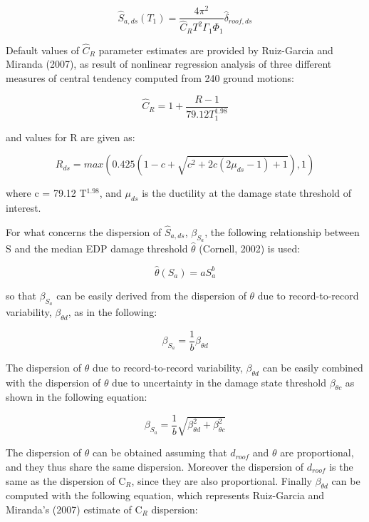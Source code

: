 \begin{equation}
\hat{S}_{a,ds}(T_1) = \frac{4 \pi^2}{\hat{C}_R T^2 \Gamma_1 \Phi_1} \hat{\delta}_{roof, ds}
\label{eq:Sa_RGM}
\end{equation}

Default values of $\hat{C}_R$ parameter estimates are provided by Ruiz-Garcia and Miranda (2007), as result of nonlinear regression analysis of three different measures of central tendency computed from 240 ground motions:

\begin{equation}
\hat{C}_R = 1 + \frac{R - 1}{79.12 T_1 ^{1.98}}
\label{eq:Cr_RGM}
\end{equation}

and values for R are given as:

\begin{equation}
R_{ds} = max(0.425(1 - c + \sqrt{c^2 + 2c(2 \mu_{ds} - 1) + 1}),1)
\label{eq:R_RGM}
\end{equation}

where c = 79.12 T$^{1.98}$, and $\mu_{ds}$ is the ductility at the damage state threshold of interest.

For what concerns the dispersion of $\hat{S}_{a,ds}$, $\beta_{S_a}$, the following relationship between S and the median EDP damage threshold $\hat{\theta}$ (Cornell, 2002) is used:

\begin{equation}
\hat{\theta}(S_a) = a S_a^b
\end{equation}

so that $\beta_{S_a}$ can be easily derived from the dispersion of $\theta$ due to record-to-record variability, $\beta_{\theta d}$, as in the following:

\begin{equation}
\beta_{S_a} = \frac{1}{b} \beta_{\theta d}
\label{eq:betaSa_RGM}
\end{equation}

The dispersion of $\theta$ due to record-to-record variability, $\beta_{\theta d}$ can be easily combined with the dispersion of $\theta$ due to uncertainty in the damage state threshold $\beta_{\theta c}$ as shown in the following equation:

\begin{equation}
\beta_{S_a} = \frac{1}{b} \sqrt{\beta_{\theta d}^2 + \beta_{\theta c}^2}
\label{eq:betaSc_RGM}
\end{equation}

The dispersion of $\theta$ can be obtained assuming that $d_{roof}$ and $\theta$ are proportional, and they thus share the same dispersion. Moreover the dispersion of $d_{roof}$ is the same as the dispersion of C$_R$, since they are also proportional. Finally $\beta_{\theta d}$ can be computed with the following equation, which represents Ruiz-Garcia and Miranda's (2007) estimate of C$_R$ dispersion:

